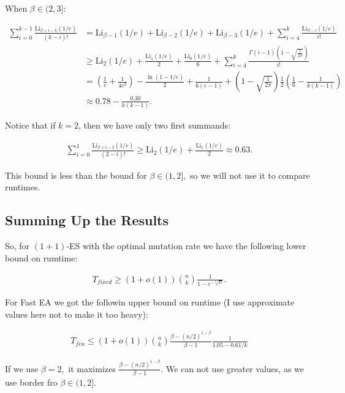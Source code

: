 \documentclass{article}
\begin{document}
When $\beta \in (2, 3]$:

\begin{align*}
  \sum\limits_{i = 0}^{k - 1} \frac{\text{Li}_{\beta + i - k}(1/e)}{(k - i)!} &= \text{Li}_{\beta - 1}(1/e) + \text{Li}_{\beta - 2}(1/e) + \text{Li}_{\beta - 3}(1/e) + \sum\limits_{i = 4}^{k} \frac{\text{Li}_{\beta - i}(1/e)}{i!} \\
  & \ge \text{Li}_2(1/e) + \frac{\text{Li}_1(1/e)}{2} + \frac{\text{Li}_0(1/e)}{6} + \sum\limits_{i = 4}^{k} \frac{\Gamma(i - 1)\left(1 - \sqrt{\frac{1}{2\pi}}\right)}{i!} \\
  &= \left(\frac{1}{e} + \frac{1}{4e^2}\right)-\frac{\ln(1 - 1/e)}{2} + \frac{1}{6(e - 1)} + \left(1 - \sqrt{\frac{1}{2\pi}}\right) \frac{1}{2}\left(\frac{1}{6} - \frac{1}{k(k - 1)}\right)
  \\ &\approx 0.78 - \frac{0.30}{k(k - 1)}.
\end{align*}

Notice that if $k = 2$, then we have only two first summands:

\begin{align*}
  \sum\limits_{i = 0}^{1} \frac{\text{Li}_{\beta + i - 2}(1/e)}{(2 - i)!} \ge \text{Li}_2(1/e) + \frac{\text{Li}_1(1/e)}{2} \approx 0.63.
\end{align*}

This bound is less than the bound for $\beta \in (1, 2],$ so we will not use it to compare runtimes.

\subsection{Summing Up the Results}

So, for $(1 + 1)$-ES with the optimal mutation rate we have the following lower bound on rumtime:

\begin{align*}
  T_{fixed} \ge (1 + o(1))\binom{n}{k} \frac{1}{1 - e^{-\sqrt[k]{k!}}}.
\end{align*}

For Fast EA we got the followin upper bound on runtime (I use approximate values here not to make it too heavy):

\begin{align*}
  T_{fea} \le (1 + o(1))\binom{n}{k} \frac{\beta - (n/2)^{1 - \beta}}{\beta - 1} \frac{1}{1.05 - 0.61/k}
\end{align*}

If we use $\beta = 2,$ it maximizes $\frac{\beta - (n/2)^{1 - \beta}}{\beta - 1}.$ We can not use greater values, as we use border fro $\beta \in (1, 2].$
\end{document}
